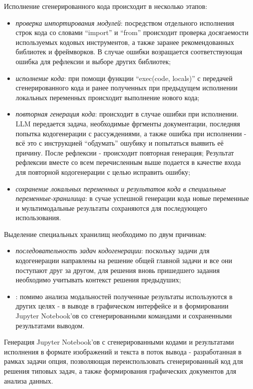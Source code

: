 \begin{enumerate}
Исполнение сгенерированного кода происходит в несколько этапов:
\begin{itemize}
    \item \textit{проверка импортирования модулей}: посредством отдельного исполнения строк кода 
со словами ``import'' и ``from'' происходит проверка досягаемости используемых 
кодовых инструментов, а также заранее рекомендованных библиотек и фреймворков. В случае 
ошибки возращается соответствующая ошибка для рефлексии и выборе других библиотек;
    \item \textit{исполнение кода}: при помощи функции ``exec(code, locals)'' с передачей
сгенерированного кода и ранее полученных при предыдущем исполнении локальных переменных 
происходит выполнение нового кода;
    \item \textit{повторная генерация кода}: происходит в случае ошибки при исполнении. LLM 
передается задача, необходимые фргменты документации, последняя попытка кодогенерации с 
рассуждениями, а также ошибка при исполнении - всё это с инструкцией ``обдумать'' 
ошубику и попытаться выявить её причину. После рефлексии - происходит повторная генерация; 
Результат рефлексии вместе со всем перечисленным выше подается в качестве входа
для повторной кодогенерации с целью исправить ошибку;
    \item \textit{сохранение локальных переменных и результатов кода в специальные 
переменные-хранилища}: в сучае успешной генерации кода новые переменные и 
мультимодальные результаты сохраняются для последующего использования. 
\end{itemize}

Выделение специальных хранилищ необходимо по двум причинам:
\begin{itemize}
    \item \textit{последовательность задач кодогенерации}: 
поскольку задачи для кодогенерации направлены на решение общей главной задачи
и все они поступают друг за другом, для решения вновь пришедшего задания
необходимо учитывать контекст решения предыдуших;
    \item {}: помимо анализа модальностей
полученные результаты используются в других целях - в выводе в 
графическом интерфейсе и в формировании Jupyter Notebook'ов со сгенерированными командами
и сохраненными результатами выводом. 
\end{itemize}

Генерация Jupyter Notebook'ов с сгенерированными кодами и результатами исполнения
в формате изображений и текста в поток вывода - разработанная в рамках задачи опция, 
позволяющая переиспользовать сгенерированный код для решения типовых задач, а также
формирования графических документов для анализа данных. 


\end{enumerate}
